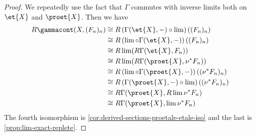 \begin{proof}
    We repeatedly use the fact that $\Gamma$ commutes with inverse limits both on $\et{X}$ and $\proet{X}$.
    Then we have
    \begin{align*}
        R \gammacont(X, (F_n)_n) &\cong R \left( \Gamma(\et{X}, -) \circ \lim \right) ( (F_n)_n ) \\
                                    &\cong R \left( \lim \circ \Gamma(\et{X}, -) \right) ( (F_n)_n ) \\
                                    &\cong R \lim ( R \Gamma(\et{X}, F_n)) \\
                                    &\cong R \lim ( R \Gamma(\proet{X}, \nu^{*} F_n)) \\
                                    &\cong R \left( \lim \circ \Gamma(\proet{X}, -) \right) ( (\nu^* F_n)_n ) \\
                                    &\cong R \left( \Gamma(\proet{X}, -) \circ \lim \right) ( (\nu^* F_n)_n ) \\
                                    &\cong R \Gamma(\proet{X}, R \lim \nu^* F_n) \\
                                    &\cong R \Gamma(\proet{X}, \lim \nu^* F_n) \\
    \end{align*}
    The fourth isomorphism is \ref{cor:derived-sections-proetale-etale-iso} and the last
    is \ref{prop:lim-exact-replete}.
\end{proof}
